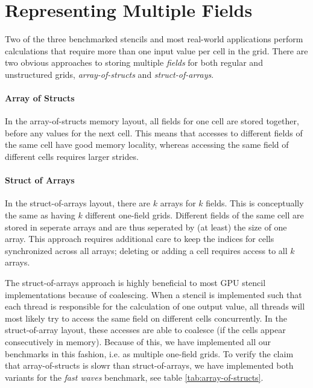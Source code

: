 \section{Representing Multiple Fields} \label{sec:representing-multiple-fields}

Two of the three benchmarked stencils and most real-world applications perform calculations that require more than one input value per cell in the grid. There are two obvious approaches to storing multiple \emph{fields} for both regular and unstructured grids, \emph{array-of-structs} and \emph{struct-of-arrays}.

\paragraph{Array of Structs}
In the array-of-structs memory layout, all fields for one cell are stored together, before any values for the next cell. This means that accesses to different fields of the same cell have good memory locality, whereas accessing the same field of different cells requires larger strides.

\paragraph{Struct of Arrays}
In the struct-of-arrays layout, there are $k$ arrays for $k$ fields. This is conceptually the same as having $k$ different one-field grids. Different fields of the same cell are stored in seperate arrays and are thus seperated by (at least) the size of one array. This approach requires additional care to keep the indices for cells synchronized across all arrays; deleting or adding a cell requires access to all $k$ arrays.

The struct-of-arrays approach is highly beneficial to most GPU stencil implementations because of coalescing. When a stencil is implemented such that each thread is responsible for the calculation of one output value, all threads will most likely try to access the same field on different cells concurrently. In the struct-of-array layout, these accesses are able to coalesce (if the cells appear consecutively in memory).  Because of this, we have implemented all our benchmarks in this fashion, i.e. as multiple one-field grids. To verify the claim that array-of-structs is slowr than struct-of-arrays, we have implemented both variants for the \emph{fast waves} benchmark, see table \ref{tab:array-of-structs}.

